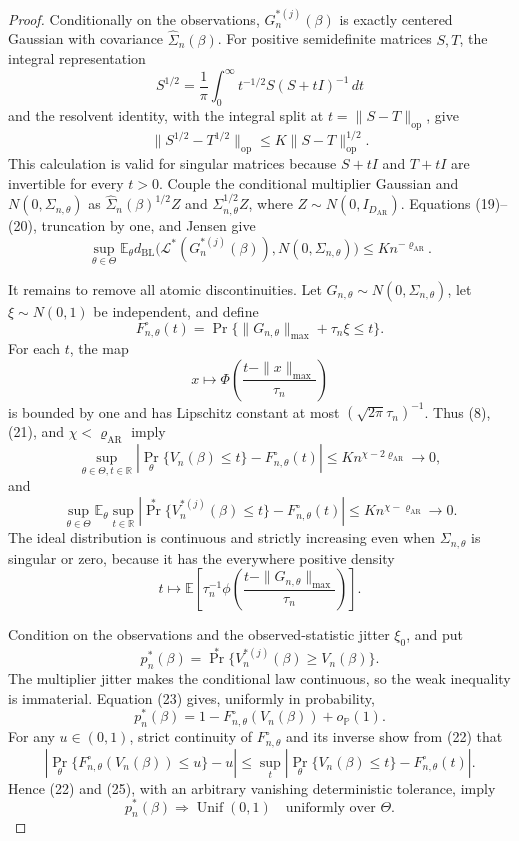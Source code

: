 \documentclass{article}
\begin{document}
\begin{proof}
Conditionally on the observations, \(G_n^{*(j)}(\beta)\) is exactly centered Gaussian with covariance \(\widehat\Sigma_n(\beta)\).  For positive semidefinite matrices \(S,T\), the integral representation
\[
 S^{1/2}=\frac1\pi\int_0^\infty t^{-1/2}S(S+tI)^{-1}\,dt
\]
and the resolvent identity, with the integral split at
\(t=\|S-T\|_{\mathrm{op}}\), give
\[
 \|S^{1/2}-T^{1/2}\|_{\mathrm{op}}
 \leq K\|S-T\|_{\mathrm{op}}^{1/2}. \tag{20}
\]
This calculation is valid for singular matrices because \(S+tI\) and \(T+tI\) are invertible for every \(t>0\).  Couple the conditional multiplier Gaussian and \(N(0,\Sigma_{n,\theta})\) as
\(\widehat\Sigma_n(\beta)^{1/2}Z\) and
\(\Sigma_{n,\theta}^{1/2}Z\), where \(Z\sim N(0,I_{D_{\mathrm{AR}}})\).  Equations (19)--(20), truncation by one, and Jensen give
\[
 \sup_{\theta\in\Theta}\mathbb E_\theta
 d_{\mathrm{BL}}\bigl(\mathcal L^*(G_n^{*(j)}(\beta)),
 N(0,\Sigma_{n,\theta})\bigr)
 \leq K n^{-\varrho_{\mathrm{AR}}}. \tag{21}
\]

It remains to remove all atomic discontinuities.  Let
\(G_{n,\theta}\sim N(0,\Sigma_{n,\theta})\), let
\(\xi\sim N(0,1)\) be independent, and define
\[
 F_{n,\theta}^{\circ}(t)
 =\Pr\{\|G_{n,\theta}\|_{\max}+\tau_n\xi\leq t\}.
\]
For each \(t\), the map
\[
 x\longmapsto
 \Phi\!\left(\frac{t-\|x\|_{\max}}{\tau_n}\right)
\]
is bounded by one and has Lipschitz constant at most
\((\sqrt{2\pi}\tau_n)^{-1}\).  Thus (8), (21), and
\(\chi<\varrho_{\mathrm{AR}}\) imply
\[
 \sup_{\theta\in\Theta,t\in\mathbb R}
 \left|\Pr_\theta\{V_n(\beta)\leq t\}
 -F_{n,\theta}^{\circ}(t)\right|
 \leq K n^{\chi-2\varrho_{\mathrm{AR}}}\longrightarrow0, \tag{22}
\]
and
\[
 \sup_{\theta\in\Theta}\mathbb E_\theta\sup_{t\in\mathbb R}
 \left|\Pr^*\{V_n^{*(j)}(\beta)\leq t\}
 -F_{n,\theta}^{\circ}(t)\right|
 \leq K n^{\chi-\varrho_{\mathrm{AR}}}\longrightarrow0. \tag{23}
\]
The ideal distribution is continuous and strictly increasing even when
\(\Sigma_{n,\theta}\) is singular or zero, because it has the everywhere positive density
\[
 t\longmapsto
 \mathbb E\!\left[\tau_n^{-1}\phi\!\left(
 \frac{t-\|G_{n,\theta}\|_{\max}}{\tau_n}\right)\right]. \tag{24}
\]

Condition on the observations and the observed-statistic jitter \(\xi_0\), and put
\[
 p_n^*(\beta)=\Pr^*\{V_n^{*(j)}(\beta)\geq V_n(\beta)\}.
\]
The multiplier jitter makes the conditional law continuous, so the weak inequality is immaterial.  Equation (23) gives, uniformly in probability,
\[
 p_n^*(\beta)
 =1-F_{n,\theta}^{\circ}(V_n(\beta))+o_{\mathbb P}(1). \tag{25}
\]
For any \(u\in(0,1)\), strict continuity of \(F_{n,\theta}^{\circ}\) and its inverse show from (22) that
\[
 \left|\Pr_\theta\{F_{n,\theta}^{\circ}(V_n(\beta))\leq u\}-u\right|
 \leq
 \sup_t\left|\Pr_\theta\{V_n(\beta)\leq t\}
                  -F_{n,\theta}^{\circ}(t)\right|.
\]
Hence (22) and (25), with an arbitrary vanishing deterministic tolerance, imply
\[
 p_n^*(\beta)\Longrightarrow\operatorname{Unif}(0,1)
 \quad\text{uniformly over }\Theta. \tag{26}
\]


\end{proof}
\end{document}
